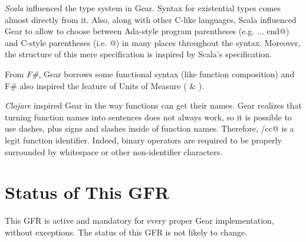 \emph{Scala} influenced the type system in Gear. Syntax for existential types comes almost directly from it. Also, along with other C-like languages, Scala influenced Gear to allow to choose between Ada-style program parentheses (e.g. \lstinline@begin $\ldots$ end@) and C-style parentheses (i.e. \lstinline@{ $\ldots$ }@) in many places throughout the syntax. Moreover, the structure of this mere specification is inspired by Scala's specification. 

From \emph{F\#}, Gear borrows some functional syntax (like function composition) and F\# also inspired the feature of Units of Measure ( \& ). 

\emph{Clojure} inspired Gear in the way functions can get their names. Gear realizes that turning function names into sentences does not always work, so it is possible to use dashes, plus signs and slashes inside of function names. Therefore, \lstinline@call/cc@ is a legit function identifier. Indeed, binary operators are required to be properly surrounded by whitespace or other non-identifier characters.






\section*{Status of This GFR}

This GFR is active and mandatory for every proper Gear implementation, without exceptions. The status of this GFR is not likely to change. 






